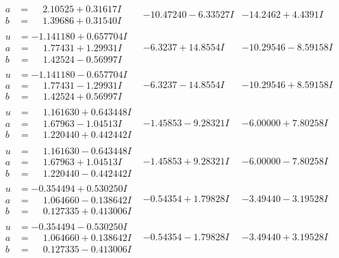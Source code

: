 \documentclass[1p]{elsarticle_modified}
\theoremstyle{definition}
\begin{document}
$$\begin{array}{c|c|c}
\begin{aligned}
a &= \phantom{-}2.10525 + 0.31617 I \\
b &= \phantom{-}1.39686 + 0.31540 I\end{aligned}
 & -10.47240 - 6.33527 I & -14.2462 + 4.4391 I \\ \hline\begin{aligned}
u &= -1.141180 + 0.657704 I \\
a &= \phantom{-}1.77431 + 1.29931 I \\
b &= \phantom{-}1.42524 - 0.56997 I\end{aligned}
 & -6.3237 + 14.8554 I & -10.29546 - 8.59158 I \\ \hline\begin{aligned}
u &= -1.141180 - 0.657704 I \\
a &= \phantom{-}1.77431 - 1.29931 I \\
b &= \phantom{-}1.42524 + 0.56997 I\end{aligned}
 & -6.3237 - 14.8554 I & -10.29546 + 8.59158 I \\ \hline\begin{aligned}
u &= \phantom{-}1.161630 + 0.643448 I \\
a &= \phantom{-}1.67963 - 1.04513 I \\
b &= \phantom{-}1.220440 + 0.442442 I\end{aligned}
 & -1.45853 - 9.28321 I & -6.00000 + 7.80258 I \\ \hline\begin{aligned}
u &= \phantom{-}1.161630 - 0.643448 I \\
a &= \phantom{-}1.67963 + 1.04513 I \\
b &= \phantom{-}1.220440 - 0.442442 I\end{aligned}
 & -1.45853 + 9.28321 I & -6.00000 - 7.80258 I \\ \hline\begin{aligned}
u &= -0.354494 + 0.530250 I \\
a &= \phantom{-}1.064660 - 0.138642 I \\
b &= \phantom{-}0.127335 + 0.413006 I\end{aligned}
 & -0.54354 + 1.79828 I & -3.49440 - 3.19528 I \\ \hline\begin{aligned}
u &= -0.354494 - 0.530250 I \\
a &= \phantom{-}1.064660 + 0.138642 I \\
b &= \phantom{-}0.127335 - 0.413006 I\end{aligned}
 & -0.54354 - 1.79828 I & -3.49440 + 3.19528 I \\ \hline\begin{aligned}

\end{aligned}
\end{array}$$
\end{document}
